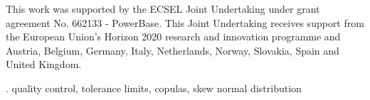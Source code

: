 \documentclass[12pt]{article}
\begin{document}

This work was supported by the ECSEL Joint Undertaking under grant agreement No. 662133 - PowerBase. This Joint Undertaking receives support from the European Union's Horizon 2020 research and innovation programme and Austria, Belgium, Germany, Italy, Netherlands, Norway, Slovakia, Spain and United Kingdom.

\vskip 2mm

. quality control, tolerance limits, copulas, skew normal distribution
\end{document}
